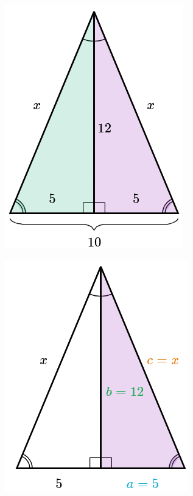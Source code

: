 \begin{solutionbox}{14cm}
    \begin{minipage}{0.35\textwidth}
        \begin{figure}[H]
            \centering
            \includegraphics[width=0.65\linewidth]{../images/pitagoras11a.png}
            \caption{}
            \label{fig:pitagoras11a}
        \end{figure}
        \begin{figure}[H]
            \centering
            \includegraphics[width=0.65\linewidth]{../images/pitagoras11b.png}

\end{figure}
\end{minipage}
\end{solutionbox}
